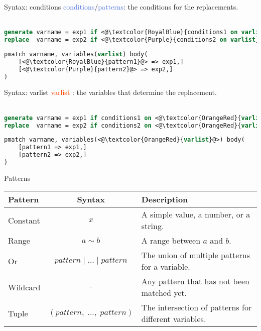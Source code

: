 \documentclass[11pt]{beamer}
\begin{document}
\begin{frame}[fragile]{Syntax: conditions}
\textcolor{RoyalBlue}{conditions}/\textcolor{RoyalBlue}{patterns}: the conditions for the replacements. \\~

\begin{lstlisting}[language=Stata]
generate varname = exp1 if <@\textcolor{RoyalBlue}{conditions1 on varlist}@>
replace  varname = exp2 if <@\textcolor{Purple}{conditions2 on varlist}@>
\end{lstlisting}

\begin{lstlisting}[language=Stata]
pmatch varname, variables(varlist) body(
    [<@\textcolor{RoyalBlue}{pattern1}@> => exp1,]
    [<@\textcolor{Purple}{pattern2}@> => exp2,]
)
\end{lstlisting}
\end{frame}

\begin{frame}[fragile]{Syntax: varlist}
\textcolor{OrangeRed}{varlist} : the variables that determine the replacement. \\~

\begin{lstlisting}[language=Stata]
generate varname = exp1 if conditions1 on <@\textcolor{OrangeRed}{varlist}@>
replace  varname = exp2 if conditions2 on <@\textcolor{OrangeRed}{varlist}@>
\end{lstlisting}

\begin{lstlisting}[language=Stata]
pmatch varname, variables(<@\textcolor{OrangeRed}{varlist}@>) body(
    [pattern1 => exp1,]
    [pattern2 => exp2,]
)
\end{lstlisting}
\end{frame}

\begin{frame}{Patterns}
\begin{table}[]
\scriptsize
\renewcommand{\arraystretch}{1.5} 
\begin{tabular}{|l|c|l|}
\hline
 \footnotesize \bf{Pattern} & \footnotesize \bf{Syntax} & \footnotesize \bf{Description} \\ \hline
 Constant \; & $x$                                   & A simple value, a number, or a string. \\ \hline
 Range \;    & $a \sim b$                            & A range between $a$ and $b$. \\ \hline
 Or \;       & $pattern \; | \; ... \; | \; pattern$ & The union of multiple patterns for a variable. \\ \hline
 Wildcard \; & $\_$                                  & Any pattern that has not been matched yet. \\ \hline
 Tuple \;    & $(pattern, \; ..., \; pattern)$       & The intersection of patterns for different variables. \\ \hline
\end{tabular}
\end{table}
\end{frame}
\end{document}

